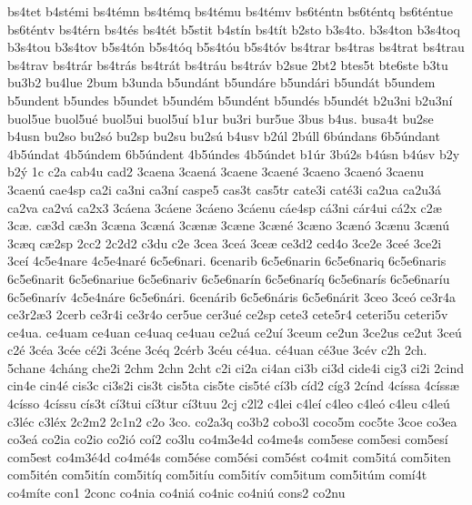 {bs4tet
b4st^^e9mi
bs4t^^e9mn
bs4t^^e9mq
bs4t^^e9mu
bs4t^^e9mv
bs6t^^e9ntn
bs6t^^e9ntq
bs6t^^e9ntue
bs6t^^e9ntv
bs4t^^e9rn
bs4t^^e9s
bs4t^^e9t
b5stit
b4st^^edn
bs4t^^edt
b2sto
b3s4to.
b3s4ton
b3s4toq
b3s4tou
b3s4tov
b5s4t^^f3n
b5s4t^^f3q
b5s4t^^f3u
b5s4t^^f3v
bs4trar
bs4tras
bs4trat
bs4trau
bs4trav
bs4tr^^e1r
bs4tr^^e1s
bs4tr^^e1t
bs4tr^^e1u
bs4tr^^e1v
b2sue
2bt2
btes5t
bte6ste
b3tu
bu3b2
bu4lue
2bum
b3unda
b5und^^e1nt
b5und^^e1re
b5und^^e1ri
b5und^^e1t
b5undem
b5undent
b5undes
b5undet
b5und^^e9m
b5und^^e9nt
b5und^^e9s
b5und^^e9t
b2u3ni
b2u3n^^ed
buol5ue
buol5u^^e9
buol5ui
buol5u^^ed
b1ur
bu3ri
bur5ue
3bus
b4us.
busa4t
bu2se
b4usn
bu2so
bu2s^^f3
bu2sp
bu2su
bu2s^^fa
b4usv
b2^^fal
2b^^fall
6b^^fandans
6b5^^fandant
4b5^^fandat
4b5^^fandem
6b5^^fandent
4b5^^fandes
4b5^^fandet
b1^^far
3b^^fa2s
b4^^fasn
b4^^fasv
b2y
b2^^fd
1c
c2a
cab4u
cad2
3caena
3caen^^e1
3caene
3caen^^e9
3caeno
3caen^^f3
3caenu
3caen^^fa
cae4sp
ca2i
ca3ni
ca3n^^ed
caspe5
cas3t
cas5tr
cate3i
cat^^e93i
ca2ua
ca2u3^^e1
ca2va
ca2v^^e1
ca2x3
3c^^e1ena
3c^^e1ene
3c^^e1eno
3c^^e1enu
c^^e1e4sp
c^^e13ni
c^^e1r4ui
c^^e12x
c2^^e6
3c^^e6.
c^^e63d
c^^e63n
3c^^e6na
3c^^e6n^^e1
3c^^e6n^^e6
3c^^e6ne
3c^^e6n^^e9
3c^^e6no
3c^^e6n^^f3
3c^^e6nu
3c^^e6n^^fa
3c^^e6q
c^^e62sp
2cc2
2c2d2
c3du
c2e
3cea
3ce^^e1
3ce^^e6
ce3d2
ced4o
3ce2e
3ce^^e9
3ce2i
3ce^^ed
4c5e4nare
4c5e4nar^^e9
6c5e6nari.
6cenarib
6c5e6narin
6c5e6nariq
6c5e6naris
6c5e6narit
6c5e6nariue
6c5e6nariv
6c5e6nar^^edn
6c5e6nar^^edq
6c5e6nar^^eds
6c5e6nar^^edu
6c5e6nar^^edv
4c5e4n^^e1re
6c5e6n^^e1ri.
6cen^^e1rib
6c5e6n^^e1ris
6c5e6n^^e1rit
3ceo
3ce^^f3
ce3r4a
ce3r2^^e63
2cerb
ce3r4i
ce3r4o
cer5ue
cer3u^^e9
ce2sp
cete3
cete5r4
ceteri5u
ceteri5v
ce4ua.
ce4uam
ce4uan
ce4uaq
ce4uau
ce2u^^e1
ce2u^^ed
3ceum
ce2un
3ce2us
ce2ut
3ce^^fa
c2^^e9
3c^^e9a
3c^^e9e
c^^e92i
3c^^e9ne
3c^^e9q
2c^^e9rb
3c^^e9u
c^^e94ua.
c^^e94uan
c^^e93ue
3c^^e9v
c2h
2ch.
5chane
4ch^^e1ng
che2i
2chm
2chn
2cht
c2i
ci2a
ci4an
ci3b
ci3d
cide4i
cig3
ci2i
2cind
cin4e
cin4^^e9
cis3c
ci3s2i
cis3t
cis5ta
cis5te
cis5t^^e9
c^^ed3b
c^^edd2
c^^edg3
2c^^ednd
4c^^edssa
4c^^edss^^e6
4c^^edsso
4c^^edssu
c^^eds3t
c^^ed3tui
c^^ed3tur
c^^ed3tuu
2cj
c2l2
c4lei
c4le^^ed
c4leo
c4le^^f3
c4leu
c4le^^fa
c3l^^e9c
c3l^^e9x
2c2m2
2c1n2
c2o
3co.
co2a3q
co3b2
cobo3l
coco5m
coc5te
3coe
co3ea
co3e^^e1
co2ia
co2io
co2i^^f3
co^^ed2
co3lu
co4m3e4d
co4me4s
com5ese
com5esi
com5es^^ed
com5est
co4m3^^e94d
co4m^^e94s
com5^^e9se
com5^^e9si
com5^^e9st
co4mit
com5it^^e1
com5iten
com5it^^e9n
com5it^^edn
com5it^^edq
com5it^^edu
com5it^^edv
com5itum
com5it^^fam
com^^ed4t
co4m^^edte
con1
2conc
co4nia
co4ni^^e1
co4nic
co4ni^^fa
cons2
co2nu
}
